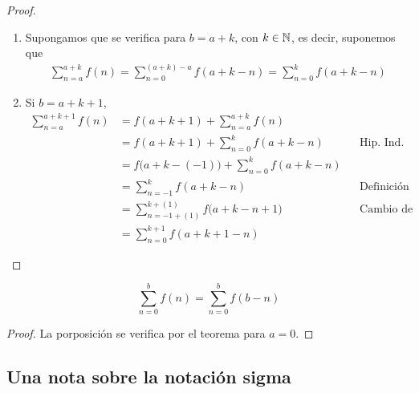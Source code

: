 \begin{enumerate}[label=\alph*)]
\begin{proof}
\begin{enumerate}[label=\Roman*)]
\begin{enumerate}[label=\roman*)]
      \item Supongamos que se verifica para $b=a+k$, con $k\in \mathbb{N}$, es decir, suponemos que
      \begin{align*}
        \sum_{n=a}^{a+k}f(n) = \sum_{n=0}^{(a+k)-a} f(a+k-n) = \sum_{n=0}^{k} f(a+k-n)
      \end{align*}

      \item Si $b=a+k+1$,
      \begin{align*}
        \sum_{n=a}^{a+k+1} f(n) &= f(a+k+1) + \sum_{n=a}^{a+k} f(n)\\
        &= f(a+k+1) + \sum_{n=0}^{k} f(a+k-n) && \text{Hip. Ind.}\\
        &= f\bigl(a+k-(-1)\bigr) + \sum_{n=0}^{k} f(a+k-n)\\
        &= \sum_{n=-1}^k f(a+k-n) && \text{Definición (de sumatoria)}\\
        &= \sum_{n=-1+(1)}^{k+(1)} f\bigl(a+k-n+1\bigr) && \text{Cambio de índice}\\
        &= \sum_{n=0}^{k+1} f(a+k+1-n)
      \end{align*}
      
    \end{enumerate}

    \end{enumerate}
  \end{proof}

   \[\sum_{n=0}^{b}f(n) = \sum_{n=0}^{b} f(b-n)\]

  \begin{proof}\leavevmode
    La porposición se verifica por el teorema para $a=0$.
  \end{proof}

    
  \end{enumerate}

\subsection*{Una nota sobre la notación sigma}




